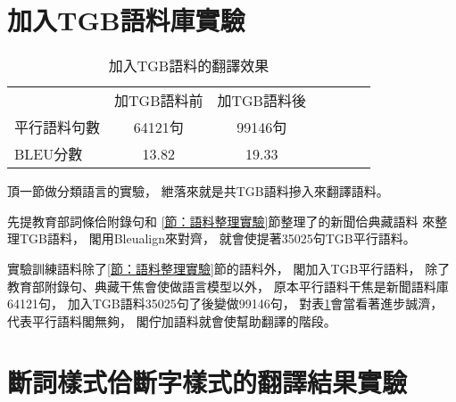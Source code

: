 \section{加入TGB語料庫實驗}
\label{節：加入TGB語料庫實驗}

\begin{table}
\caption{加入TGB語料的翻譯效果}
\label{表：加入TGB語料的翻譯效果}
\centering
\begin{tabular}{lcccccc}
& 加TGB語料前 & 加TGB語料後\\
平行語料句數 & 64121句 & 99146句\\
BLEU分數 & 13.82 & 19.33\\
\end{tabular}
\end{table}

頂一節做分類語言的實驗，
紲落來就是共TGB語料摻入來翻譯語料。

先提教育部詞條佮附錄句和
\ref{節：語料整理實驗}節整理了的新聞佮典藏語料
來整理TGB語料，
閣用Bleualign來對齊，
就會使提著35025句TGB平行語料。

實驗訓練語料除了\ref{節：語料整理實驗}節的語料外，
閣加入TGB平行語料，
除了教育部附錄句、典藏干焦會使做語言模型以外，
原本平行語料干焦是新聞語料庫64121句，
加入TGB語料35025句了後變做99146句，
對表\ref{表：加入TGB語料的翻譯效果}會當看著進步誠濟，
代表平行語料閣無夠，
閣佇加語料就會使幫助翻譯的階段。

\section{斷詞樣式佮斷字樣式的翻譯結果實驗}
\label{節：斷詞樣式佮斷字樣式的翻譯結果實驗}


